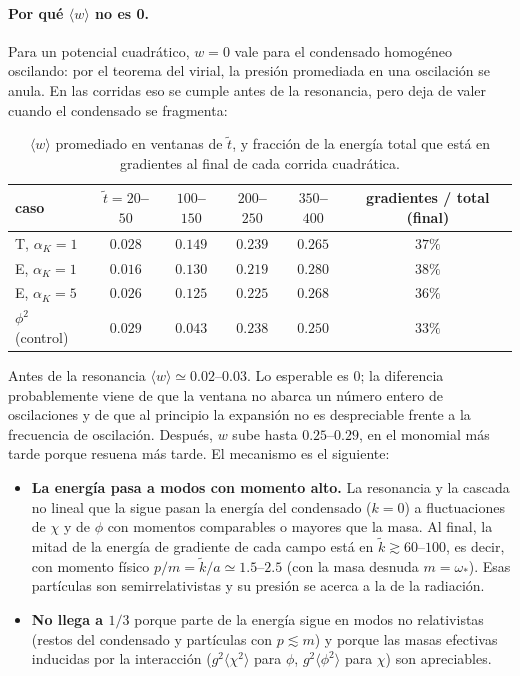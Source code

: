 \documentclass[11pt]{article}
\begin{document}
            \paragraph{Por qué $\langle w\rangle$ no es 0.} Para un potencial cuadrático, $w = 0$ vale para el condensado homogéneo oscilando: por el teorema del virial, la presión promediada en una oscilación se anula. En las corridas eso se cumple antes de la resonancia, pero deja de valer cuando el condensado se fragmenta:
            \begin{table}[H]
                \centering
                \small
                \begin{tabular}{lccccc}
                    \toprule
                    caso & $\tilde t = 20$--$50$ & $100$--$150$ & $200$--$250$ & $350$--$400$ & gradientes / total (final) \\
                    \midrule
                    T, $\alpha_K = 1$ & $0.028$ & $0.149$ & $0.239$ & $0.265$ & $37\%$ \\
                    E, $\alpha_K = 1$ & $0.016$ & $0.130$ & $0.219$ & $0.280$ & $38\%$ \\
                    E, $\alpha_K = 5$ & $0.026$ & $0.125$ & $0.225$ & $0.268$ & $36\%$ \\
                    $\phi^2$ (control) & $0.029$ & $0.043$ & $0.238$ & $0.250$ & $33\%$ \\
                    \bottomrule
                \end{tabular}
                \caption{$\langle w\rangle$ promediado en ventanas de $\tilde t$, y fracción de la energía total que está en gradientes al final de cada corrida cuadrática.}
                \label{tab:w-cuadraticos}
            \end{table}
            Antes de la resonancia $\langle w\rangle \simeq 0.02$--$0.03$. Lo esperable es 0; la diferencia probablemente viene de que la ventana no abarca un número entero de oscilaciones y de que al principio la expansión no es despreciable frente a la frecuencia de oscilación. Después, $w$ sube hasta $0.25$--$0.29$, en el monomial más tarde porque resuena más tarde. El mecanismo es el siguiente:
            \begin{itemize}
                \item \textbf{La energía pasa a modos con momento alto.} La resonancia y la cascada no lineal que la sigue pasan la energía del condensado ($k = 0$) a fluctuaciones de $\chi$ y de $\phi$ con momentos comparables o mayores que la masa. Al final, la mitad de la energía de gradiente de cada campo está en $\tilde k \gtrsim 60$--$100$, es decir, con momento físico $p/m = \tilde k/a \simeq 1.5$--$2.5$ (con la masa desnuda $m = \omega_*$). Esas partículas son semirrelativistas y su presión se acerca a la de la radiación.
                \item \textbf{No llega a $1/3$} porque parte de la energía sigue en modos no relativistas (restos del condensado y partículas con $p \lesssim m$) y porque las masas efectivas inducidas por la interacción ($g^2\langle\chi^2\rangle$ para $\phi$, $g^2\langle\phi^2\rangle$ para $\chi$) son apreciables.
            \end{itemize}
\end{document}
